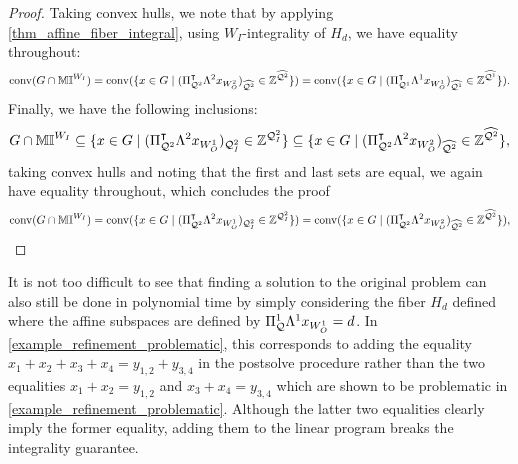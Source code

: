 \documentclass[pdflatex,sn-mathphys-num]{sn-jnl}%
\theoremstyle{thmstyleone}%
\theoremstyle{thmstylethree}%
\theoremstyle{thmstyletwo}%
\newcommand{\conv}{\mathrm{conv}}
\begin{document}
\begin{proof}
    Taking convex hulls, we note that by applying \cref{thm_affine_fiber_integral}, using ${W_I}$-integrality of $H_d$, we have equality throughout:
        \begin{equation*}
        \conv(G\cap \M^{W_I}) = \conv(\{x \in G \mid (\transpose{\Pi_{\MQ^2}} \Lambda^2 x_{W^2_O})_{\widehat{\MQ^2}} \in \Z^{\widehat{\MQ^2}}\}) = \conv(\{x \in G \mid (\transpose{\Pi_{\MQ^1}} \Lambda^1 x_{W^1_O})_{\widehat{\MQ^1}} \in \Z^{\widehat{\MQ^1}}\}).
    \end{equation*}
    Finally, we have the following inclusions:
        \begin{equation*}
        G\cap \mathbb{MI}^{W_I}
         \subseteq \{x \in G \mid (\Pi_{\mathcal{Q}^2}^{\intercal} \Lambda^2 x_{W^1_O})_{\mathcal{Q}^2_I} \in \mathbb{Z}^{\mathcal{Q}^2_I}\} \subseteq \{x \in G \mid (\Pi_{\mathcal{Q}^2}^{\intercal} \Lambda^2 x_{W^2_O})_{\widehat{\mathcal{Q}^2}} \in \mathbb{Z}^{\widehat{\mathcal{Q}^2}}\},
    \end{equation*}
    taking convex hulls and noting that the first and last sets are equal, we again have equality throughout, which concludes the proof
            \begin{equation*}
        \conv(G\cap \M^{W_I})
         = \conv(\{x \in G \mid (\transpose{\Pi_{\MQ^2}} \Lambda^2 x_{W^1_O})_{\MQ^2_I} \in \Z^{\MQ^2_I}\}) = \conv(\{x \in G \mid (\transpose{\Pi_{\MQ^2}} \Lambda^2 x_{W^2_O})_{\widehat{\MQ^2}} \in \Z^{\widehat{\MQ^2}}\}),
    \end{equation*}
    
\end{proof}
It is not too difficult to see that finding a solution to the original problem can also still be done in polynomial time by simply considering the fiber $H_d$ defined where the affine subspaces are defined by $\Pi_{\mathcal{Q}}^1 \Lambda^1 x_{W^1_O} = d$. In \cref{example_refinement_problematic}, this corresponds to adding the equality $x_1 + x_2 + x_3 + x_4 = y_{1,2} + y_{3,4}$ in the postsolve procedure rather than the two equalities $x_1 + x_2 = y_{1,2}$ and $x_3 + x_4 = y_{3,4}$ which are shown to be problematic in \cref{example_refinement_problematic}. Although the latter two equalities clearly imply the former equality, adding them to the linear program breaks the integrality guarantee.
\end{document}
